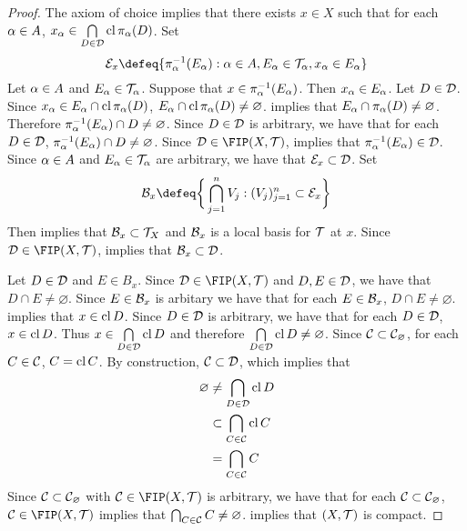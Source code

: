 \documentclass{book}
\begin{document}
\begin{proof}
		The axiom of choice implies that there exists $x \in X$ such that for each $\alpha \in A$, $x_{\alpha} \in \bigcap\limits_{D \in \mathcal{D}} \operatorname{cl} \pi_{\alpha}(D)$. Set 
		$$\ME_x \defeq \{\pi_{\al}^{-1}(E_{\al}): \al \in A, E_{\al} \in \MT_{\al}, x_{\al} \in E_{\al}\}$$ 
		Let $\alpha \in A$ and $E_{\alpha} \in \mathcal{T}_{\alpha}$. Suppose that $x \in \pi_{\alpha}^{-1}(E_{\alpha})$. Then $x_{\alpha} \in E_{\alpha}$. Let $D \in \mathcal{D}$. Since $x_{\alpha} \in  E_{\alpha} \cap \operatorname{cl} \pi_{\alpha}(D)$, $ E_{\alpha} \cap \operatorname{cl} \pi_{\alpha}(D) \neq \varnothing$.  implies that $ E_{\alpha} \cap \pi_{\alpha}(D) \neq \varnothing$. Therefore $\pi_{\alpha}^{-1}(E_{\alpha}) \cap D \neq \varnothing$. Since $D \in \mathcal{D}$ is arbitrary, we have that for each $D \in \mathcal{D}$, $\pi_{\alpha}^{-1}(E_{\alpha}) \cap D \neq \varnothing$. Since $\MD \in \FIP(X, \MT)$,  implies that $\pi_{\alpha}^{-1}(E_{\alpha}) \in \mathcal{D}$. Since $\alpha \in A$ and $E_{\alpha} \in \mathcal{T}_{\alpha}$ are arbitrary, we have that $\mathcal{E}_x \subset \mathcal{D}$. Set 
		$$\MB_x \defeq \bigg \{\bigcap_{j=1}^n V_j:(V_j)_{j=1}^n \subset \ME_x \bigg \}$$ 
		Then  implies that $\mathcal{B}_x \subset \mathcal{T}_X $ and $\mathcal{B}_x$ is a local basis for $\mathcal{T}$ at $x$. Since $\MD \in \FIP(X, \MT)$,  implies that $\mathcal{B}_x \subset \mathcal{D}$. 
		
		Let $D \in \mathcal{D}$ and $E \in B_x$. Since $\MD \in \FIP(X, \MT)$ and $D, E \in \mathcal{D}$, we have that $D \cap E \neq \varnothing$. Since $E \in \mathcal{B}_x$ is arbitary we have that for each $E \in \mathcal{B}_x$, $D \cap E \neq \varnothing$.  implies that $x \in \operatorname{cl} D$. Since $D \in \mathcal{D}$ is arbitrary, we have that for each $D \in \mathcal{D}$, $x \in \operatorname{cl} D$. Thus $x \in \bigcap\limits_{D \in \mathcal{D}} \operatorname{cl} D $ and therefore $\bigcap\limits_{D \in \mathcal{D}} \operatorname{cl} D \neq \varnothing$. Since $\mathcal{C} \subset \mathcal{C}_{\varnothing}$, for each $C \in \mathcal{C}$, $C = \operatorname{cl} C$. By construction, $\mathcal{C} \subset \mathcal{D}$, which implies that 
		\begin{align*}
			\varnothing
			& \neq \bigcap_{D \in \mathcal{D}} \operatorname{cl} D \\
			& \subset \bigcap_{C \in \mathcal{C}} \operatorname{cl} C \\
			& = \bigcap_{C \in \mathcal{C}} C 
		\end{align*}
		Since $\mathcal{C} \subset \mathcal{C}_{\varnothing}$ with $\MC \in \FIP(X, \MT)$ is arbitrary, we have that for each $\mathcal{C} \subset \mathcal{C}_{\varnothing}$, $\MC \in \FIP(X, \MT)$ implies that $\bigcap_{C \in \mathcal{C}} C \neq \varnothing$.  implies that $(X, \mathcal{T})$ is compact.
 	\end{proof}
 
\end{document}
